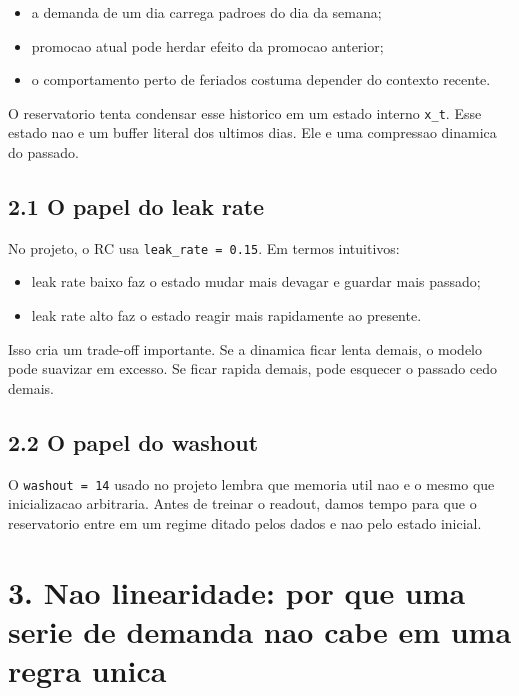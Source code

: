 \documentclass[12pt]{article}
\providecommand{\tightlist}{%
  \setlength{\itemsep}{0pt}\setlength{\parskip}{0pt}}
\begin{document}
\begin{itemize}
\tightlist
\item
  a demanda de um dia carrega padroes do dia da semana;
\item
  promocao atual pode herdar efeito da promocao anterior;
\item
  o comportamento perto de feriados costuma depender do contexto recente.
\end{itemize}

O reservatorio tenta condensar esse historico em um estado interno \texttt{x\_t}. Esse estado nao e um buffer literal dos ultimos dias. Ele e uma compressao dinamica do passado.

\subsection{2.1 O papel do leak rate}\label{21-o-papel-do-leak-rate}

No projeto, o RC usa \texttt{leak\_rate\ =\ 0.15}. Em termos intuitivos:

\begin{itemize}
\tightlist
\item
  leak rate baixo faz o estado mudar mais devagar e guardar mais passado;
\item
  leak rate alto faz o estado reagir mais rapidamente ao presente.
\end{itemize}

Isso cria um trade-off importante. Se a dinamica ficar lenta demais, o modelo pode suavizar em excesso. Se ficar rapida demais, pode esquecer o passado cedo demais.

\subsection{2.2 O papel do washout}\label{22-o-papel-do-washout}

O \texttt{washout\ =\ 14} usado no projeto lembra que memoria util nao e o mesmo que inicializacao arbitraria. Antes de treinar o readout, damos tempo para que o reservatorio entre em um regime ditado pelos dados e nao pelo estado inicial.

\section{3. Nao linearidade: por que uma serie de demanda nao cabe em uma regra unica}\label{3-nao-linearidade-por-que-uma-serie-de-demanda-nao-cabe-em-uma-regra-unica}
\end{document}

